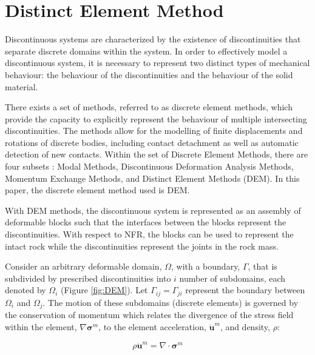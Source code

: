 \section{Distinct Element Method}

Discontinuous systems are characterized by the existence of discontinuities that separate discrete domains within the system. In order to effectively model a discontinuous system, it is necessary to represent two distinct types of mechanical behaviour: the behaviour of the discontinuities and the behaviour of the solid material.

There exists a set of methods, referred to as discrete element methods, which provide the capacity to explicitly represent the behaviour of multiple intersecting discontinuities. The methods allow for the modelling of finite displacements and rotations of discrete bodies, including contact detachment as well as automatic detection of new contacts. Within the set of Discrete Element Methods, there are four subsets \citep{CUNDALL_1992}: Modal Methods, Discontinuous Deformation Analysis Methods, Momentum Exchange Methods, and Distinct Element Methods (DEM). In this paper, the discrete element method used is DEM.

With DEM methods, the discontinuous system is represented as an assembly of deformable blocks such that the interfaces between the blocks represent the discontinuities. With respect to NFR, the blocks can be used to represent the intact rock while the discontinuities represent the joints in the rock mass. 

Consider an arbitrary deformable domain, $\Omega$, with a boundary, $\Gamma$, that is subdivided by prescribed discontinuities into $i$ number of subdomains, each denoted by $\Omega_i$ (Figure \ref{fig:DEM}). Let $\Gamma_{ij}=\Gamma_{ji}$ represent the boundary between $\Omega_i$ and $\Omega_j$. The motion of these subdomains (discrete elements) is governed by the conservation of momentum which relates the divergence of the stress field within the element, $\nabla\boldsymbol{\sigma}^m$, to the element acceleration, $\ddot{\mathbf{u}}^m$, and density, $\rho$:

\begin{equation}
\rho \ddot{\mathbf{u}}^m=\nabla\cdot\boldsymbol{\sigma}^m
\label{eqn:cauchy}
\end{equation}

